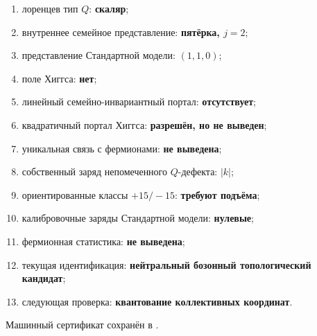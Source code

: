 \begin{protocol}
\begin{enumerate}
 \item лоренцев тип $Q$: \textbf{скаляр};
 \item внутреннее семейное представление: \textbf{пятёрка, $j=2$};
 \item представление Стандартной модели: \textbf{$(1,1,0)$};
 \item поле Хиггса: \textbf{нет};
 \item линейный семейно-инвариантный портал: \textbf{отсутствует};
 \item квадратичный портал Хиггса: \textbf{разрешён, но не выведен};
 \item уникальная связь с фермионами: \textbf{не выведена};
 \item собственный заряд непомеченного $Q$-дефекта: \textbf{$|k|$};
 \item ориентированные классы $+15/-15$: \textbf{требуют подъёма};
 \item калибровочные заряды Стандартной модели: \textbf{нулевые};
 \item фермионная статистика: \textbf{не выведена};
 \item текущая идентификация: \textbf{нейтральный бозонный
 топологический кандидат};
 \item следующая проверка: \textbf{квантование коллективных координат}.
\end{enumerate}
\end{protocol}

Машинный сертификат сохранён в
.